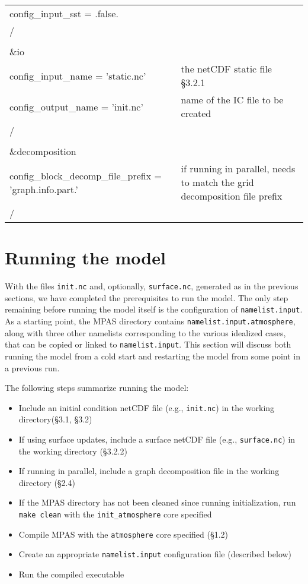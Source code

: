 \begin{longtable}{p{3.0in} |p{3.25in}}
   config\_input\_sst       = .false.                & \\
/\\
\\
\&io\\
   config\_input\_name         = 'static.nc'         & the netCDF static file \S 3.2.1 \\
   config\_output\_name        = 'init.nc'           & name of the IC file to be created \\
/\\
\\
\&decomposition\\
   config\_block\_decomp\_file\_prefix = 'graph.info.part.' & if running in parallel, needs to match the grid decomposition file prefix \\
/\\
\end{longtable}


\section{Running the model}

With the files {\tt init.nc} and, optionally, {\tt surface.nc}, generated as in the previous sections, we have completed the prerequisites to run the model.  The only step remaining before running the model itself is the configuration of {\tt namelist.input}.  As a starting point, the MPAS directory contains {\tt namelist.input.atmosphere}, along with three other namelists corresponding to the various idealized cases, that can be copied or linked to {\tt namelist.input}.  This section will discuss both running the model from a cold start and restarting the model from some point in a previous run.

The following steps summarize running the model:

\begin{itemize}
\item Include an initial condition netCDF file (e.g., {\tt init.nc}) in the working directory(\S 3.1, \S 3.2)
\item If using surface updates, include a surface netCDF file (e.g., {\tt surface.nc}) in the working directory (\S 3.2.2)
\item If running in parallel, include a graph decomposition file in the working directory (\S 2.4)
\item If the MPAS directory has not been cleaned since running initialization, run {\tt make clean} with the {\tt init\_atmosphere} core specified
\item Compile MPAS with the {\tt atmosphere} core specified (\S 1.2)
\item Create an appropriate {\tt namelist.input} configuration file (described below)
\item Run the compiled executable
\end{itemize}

